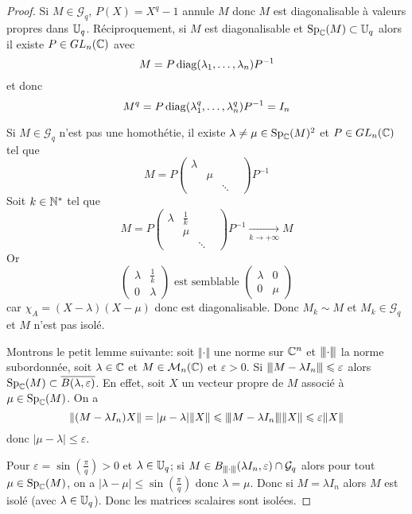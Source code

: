 \begin{proof}
	Si $M\in\mathcal{G}_{q}$, $P(X)=X^{q}-1$ annule $M$ donc $M$ est diagonalisable à valeurs propres dans $\mathbb{U}_{q}$. Réciproquement, si $M$ est diagonalisable et $\operatorname{Sp}_{\mathbb{C}}(M)\subset\mathbb{U}_{q}$ alors il existe $P\in GL_{n}(\mathbb{C})$ avec 
	\begin{equation}M=P\operatorname{diag}(\lambda_{1},\dots,\lambda_{n})P^{-1}\end{equation}
	et donc 
	\begin{equation}M^{q}=P\operatorname{diag}(\lambda_{1}^{q},\dots,\lambda_{n}^{q})P^{-1}=I_{n}\end{equation}

	Si $M\in\mathcal{G}_{q}$ n'est pas une homothétie, il existe $\lambda\neq\mu\in\operatorname{Sp}_{\mathbb{C}}(M)^{2}$ et $P\in GL_{n}(\mathbb{C})$ tel que 
	\begin{equation}M=P\begin{pmatrix}
		\lambda & &\\
		& \mu & &\\
		& & \ddots
	\end{pmatrix}P^{-1}\end{equation}
	Soit $k\in\mathbb{N}^{*}$ tel que 
	\begin{equation}M=P\begin{pmatrix}
		\lambda & \frac{1}{k}&\\
		& \mu & &\\
		& & \ddots
	\end{pmatrix}P^{-1}\xrightarrow[k\to+\infty]{}M\end{equation}
	Or 
	\begin{equation}\begin{pmatrix}
		\lambda & \frac{1}{k}\\
		0 & \lambda
	\end{pmatrix}\text{  est semblable }\begin{pmatrix}
		\lambda & 0\\
		0 & \mu
	\end{pmatrix}\end{equation}
	car $\chi_{A}=(X-\lambda)(X-\mu)$ donc est diagonalisable. Donc $M_{k}\sim M$ et $M_{k}\in\mathcal{G}_{q}$ et $M$ n'est pas isolé.

	Montrons le petit lemme suivante: soit $\Vert\cdot\Vert$ une norme sur $\mathbb{C}^{n}$ et ${\left\vert\kern-0.25ex\left\vert\kern-0.25ex\left\vert{}\cdot \right\vert\kern-0.25ex\right\vert\kern-0.25ex\right\vert}$ la norme subordonnée, soit $\lambda\in\mathbb{C}$ et $M\in\mathcal{M}_{n}(\mathbb{C})$ et $\varepsilon>0$. Si ${\left\vert\kern-0.25ex\left\vert\kern-0.25ex\left\vert{}M-\lambda I_{n} \right\vert\kern-0.25ex\right\vert\kern-0.25ex\right\vert}\leqslant\varepsilon$ alors $\operatorname{Sp}_{\mathbb{C}}(M)\subset\overline{B(\lambda,\varepsilon)}$. En effet, soit $X$ un vecteur propre de $M$ associé à $\mu\in\operatorname{Sp}_{\mathbb{C}}(M)$. On a 
	\begin{equation}\Vert (M-\lambda I_{n})X\Vert=\vert\mu-\lambda \vert \Vert X\Vert\leqslant{\left\vert\kern-0.25ex\left\vert\kern-0.25ex\left\vert{}M-\lambda I_{n} \right\vert\kern-0.25ex\right\vert\kern-0.25ex\right\vert}\Vert X\Vert\leqslant\varepsilon\Vert X\Vert\end{equation}
	donc $\vert\mu-\lambda\vert\leqslant\varepsilon$.

	Pour $\varepsilon=\sin(\frac{\pi}{q})>0$ et $\lambda\in\mathbb{U}_{q}$; si $M\in B_{{\left\vert\kern-0.25ex\left\vert\kern-0.25ex\left\vert{}\cdot \right\vert\kern-0.25ex\right\vert\kern-0.25ex\right\vert}}(\lambda I_{n},\varepsilon)\cap \mathcal{G}_{q}$ alors pour tout $\mu\in\operatorname{Sp}_{\mathbb{C}}(M)$, on a $\vert\lambda-\mu\vert\leqslant\sin(\frac{\pi}{q})$ donc $\lambda=\mu$. Donc si $M=\lambda I_{n}$
	 alors $M$ est isolé (avec $\lambda\in\mathbb{U}_{q}$). Donc les matrices scalaires sont isolées.
\end{proof}